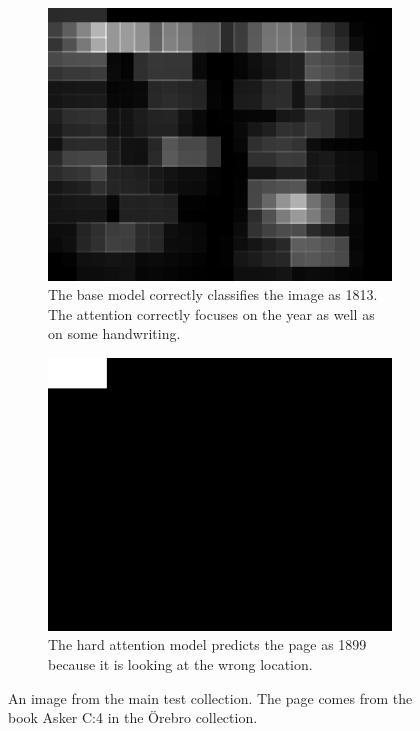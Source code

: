 \begin{figure}
    \begin{subfigure}[t]{0.45\textwidth}
        \centering
        \includegraphics[scale=1.0]{resources/SWE_attention/SoftAtt/att_S3HT-64P3-T61.jpg}
        \caption{The base model correctly classifies the image as 1813. The attention correctly focuses on the year as well as on some handwriting.}
    \end{subfigure} \quad %
    \begin{subfigure}[t]{0.45\textwidth}
        \centering    \includegraphics[scale=1.0]{resources/SWE_attention/HardAtt/att_S3HT-64P3-T61.jpg}
        \caption{The hard attention model predicts the page as 1899 because it is looking at the wrong location.}
    \end{subfigure}
    
    \caption{An image from the main test collection. The page comes from the book Asker C:4 in the Örebro collection.}
    \label{fig:attention_dep_T61}
\end{figure}
